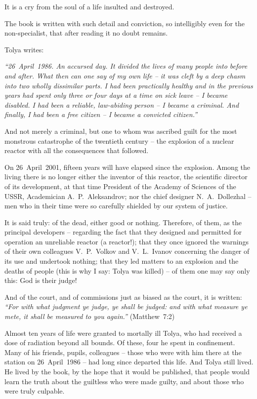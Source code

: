 \documentclass[openright]{bookest}
\begin{document}
It is a cry from the soul of a life insulted and destroyed.

The book is written with such detail and conviction, so intelligibly even for the non-specialist, that after reading it no doubt remains.

Tolya writes:

\textit{``26~April~1986. An accursed day. It divided the lives of many people into before and after. What then can one say of my own life -- it was cleft by a deep chasm into two wholly dissimilar parts. I had been practically healthy and in the previous years had spent only three or four days at a time on sick leave -- I became disabled. I had been a reliable, law-abiding person -- I became a criminal. And finally, I had been a free citizen -- I became a convicted citizen.''}

And not merely a criminal, but one to whom was ascribed guilt for the most monstrous catastrophe of the twentieth century -- the explosion of a nuclear reactor with all the consequences that followed.

On 26~April~2001, fifteen years will have elapsed since the explosion. Among the living there is no longer either the inventor of this reactor, the scientific director of its development, at that time President of the Academy of Sciences of the USSR, Academician A.~P.~Aleksandrov; nor the chief designer N.~A.~Dollezhal -- men who in their time were so carefully shielded by our system of justice.

It is said truly: of the dead, either good or nothing. Therefore, of them, as the principal developers -- regarding the fact that they designed and permitted for operation an unreliable reactor (a reactor!); that they once ignored the warnings of their own colleagues V.~P.~Volkov and V.~L.~Ivanov concerning the danger of its use and undertook nothing; that they led matters to an explosion and the deaths of people (this is why I say: Tolya was killed) -- of them one may say only this: God is their judge!

And of the court, and of commissions just as biased as the court, it is written:
\textit{``For with what judgment ye judge, ye shall be judged: and with what measure ye mete, it shall be measured to you again.''}
(Matthew~7{:}2)

Almost ten years of life were granted to mortally ill Tolya, who had received a dose of radiation beyond all bounds. Of these, four he spent in confinement. Many of his friends, pupils, colleagues -- those who were with him there at the station on 26~April~1986 -- had long since departed this life. And Tolya still lived. He lived by the book, by the hope that it would be published, that people would learn the truth about the guiltless who were made guilty, and about those who were truly culpable.
\end{document}
